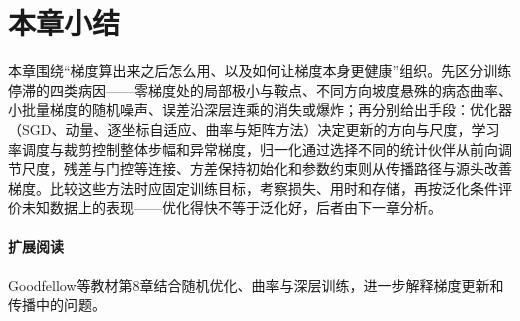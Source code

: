 \section{本章小结}
\label{sec:training-summary}

本章围绕“梯度算出来之后怎么用、以及如何让梯度本身更健康”组织。先区分训练停滞的四类病因——零梯度处的局部极小与鞍点、不同方向坡度悬殊的病态曲率、小批量梯度的随机噪声、误差沿深层连乘的消失或爆炸；再分别给出手段：优化器（SGD、动量、逐坐标自适应、曲率与矩阵方法）决定更新的方向与尺度，学习率调度与裁剪控制整体步幅和异常梯度，归一化通过选择不同的统计伙伴从前向调节尺度，残差与门控等连接、方差保持初始化和参数约束则从传播路径与源头改善梯度。比较这些方法时应固定训练目标，考察损失、用时和存储，再按泛化条件评价未知数据上的表现——优化得快不等于泛化好，后者由下一章分析。

\paragraph{扩展阅读}
Goodfellow等教材第8章结合随机优化、曲率与深层训练，进一步解释梯度更新和传播中的问题。
